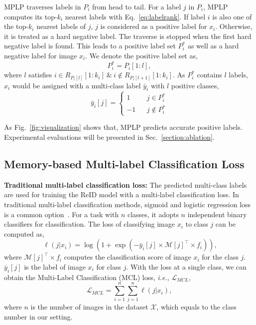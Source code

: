 \documentclass[10pt,twocolumn,letterpaper]{article}
\begin{document}
MPLP traverses labels in $P_i$ from head to tail. For a label $j$ in ${P}_{i}$, MPLP computes its top-$k_i$ nearest labels with Eq.~\eqref{eq:labelrank}. If label $i$ is also one of the top-$k_i$ nearest labels of $j$, $j$ is considered as a positive label for $x_i$. Otherwise, it is treated as a hard negative label. The traverse is stopped when the first hard negative label is found. This leads to a positive label set $P^*_i$ as well as a hard negative label for image $x_i$. We denote the positive label set as,
\begin{equation}
{P}^*_{i} = {P}_{i}[1:l],
\end{equation}
where $l$ satisfies $i \in {R}_{{P_i[l]}}[1:k_i] ~\&~ i \notin {R}_{{P_i[l+1]}}[1:k_i]$. As ${P}^*_{i}$ contains $l$ labels, $x_i$ would be assigned with a multi-class label $\bar y_i$ with $l$ positive classes,
\begin{equation}
\bar y_i[j]=\left\{
\begin{array}{rcl}
1 & & {j\in {P}^*_{i}}\\
-1 & & {j \notin {P}^*_{i}}
\end{array} \right.
\end{equation}


As Fig.~\ref{fig:visualization} shows that, MPLP predicts accurate positive labels. Experimental evaluations will be presented in Sec.~\ref{section:ablation}.

\subsection{Memory-based Multi-label Classification Loss}\label{section:mmcl}
\textbf{Traditional multi-label classification loss:} The predicted multi-class labels are used for training the ReID model with a multi-label classification loss. In traditional multi-label classification methods, sigmoid and logistic regression loss is a common option~\cite{zhang2013review,Durand_2019_CVPR,wang2018transferable,lin2018multi}. For a task with $n$ classes, it adopts $n$ independent binary classifiers for classification. The loss of classifying image $x_i$ to class $j$ can be computed as,
\begin{equation}~\label{eq:mcl}
\ell(j|x_i) = \log (1 + \exp (-\bar y_i[j]\times \mathcal{M}[j]^\top \times f_i)),
\end{equation}
where $\mathcal{M}[j]^\top \times f_i$ computes the classification score of image $x_i$ for the class $j$. $\bar y_i[j]$ is the label of image $x_i$ for class $j$. With the loss at a single class, we can obtain the Multi-Label Classification (MCL) loss, \emph{i.e.}, $\mathcal{L}_{MCL}$,
\begin{equation}
\mathcal{L}_{MCL} = \sum_{i=1}^{n}\sum_{j=1}^{n}\ell(j|x_i),
\end{equation}
where $n$ is the number of images in the dataset $\mathcal X$, which equals to the class number in our setting.
\end{document}
